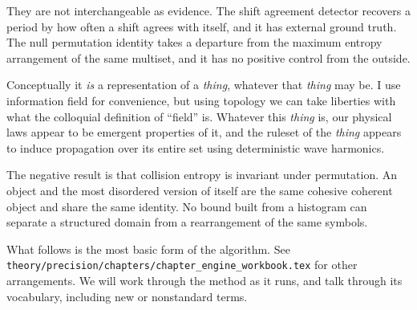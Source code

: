 They are not interchangeable as evidence. The shift agreement detector recovers a period by how
often a shift agrees with itself, and it has external ground truth. The null permutation identity
takes a departure from the maximum entropy arrangement of the same multiset, and it has no positive
control from the outside.

Conceptually it \emph{is} a representation of a \emph{thing}, whatever that \emph{thing} may be. I
use information field for convenience, but using topology we can take liberties with what the
colloquial definition of ``field'' is. Whatever this \emph{thing} is, our physical laws appear to
be emergent properties of it, and the ruleset of the \emph{thing} appears to induce propagation
over its entire set using deterministic wave harmonics.

The negative result is that collision entropy is invariant under permutation. An object and the
most disordered version of itself are the same cohesive coherent object and share the same
identity. No bound built from a histogram can separate a structured domain from a rearrangement of
the same symbols.

What follows is the most basic form of the algorithm. See
\texttt{theory/\allowbreak{}precision/\allowbreak{}chapters/\allowbreak{}chapter\_\allowbreak{}engine\_\allowbreak{}workbook.\allowbreak{}tex}
for other arrangements. We will work through the method as it runs, and talk through its
vocabulary, including new or nonstandard terms.
\cleardoublepage
